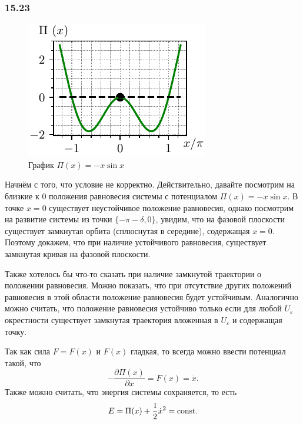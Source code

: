 \subsubsection*{15.23}



\begin{figure}
    \centering
    \includegraphics{figures/15_23.pdf}
    \caption{График $\Pi(x) = -x\sin x$}
\end{figure}


Начнём с того, что условие не корректно. 
Действительно, давайте посмотрим на близкие к $0$ положения равновесия системы с потенциалом $\Pi(x) = -x \sin x$. В точке $x=0$ существует неустойчивое положение равновесия, однако посмотрим на развитие системы из точки $\{-\pi-\delta, 0\}$, увидим, что на фазовой плоскости существует замкнутая орбита (сплюснутая в середине), содержащая $x=0$. Поэтому докажем, что при наличие устойчивого равновесия, существует замкнутая кривая на фазовой плоскости. 

Также хотелось бы что-то сказать при наличие замкнутой траектории о положении равновесия. Можно показать, что при отсутствие других положений равновесия в этой области положение равновесия будет устойчивым. Аналогично можно считать, что положение равновесия устойчиво только если для любой $U_\varepsilon$ окрестности существует замкнутая траектория вложенная в $U_\varepsilon$ и содержащая точку.

Так как сила $F = F(x)$ и $F(x)$ гладкая, то всегда можно ввести потенциал такой, что
\begin{equation*}
    -\frac{\partial \Pi(x)}{\partial x} = F(x) = \ddot{x}.
\end{equation*}
Также можно считать, что энергия системы сохраняется, то есть
\begin{equation*}
    E = \Pi(x) + \frac{1}{2} \dot{x}^2 = \text{const}.
\end{equation*}

